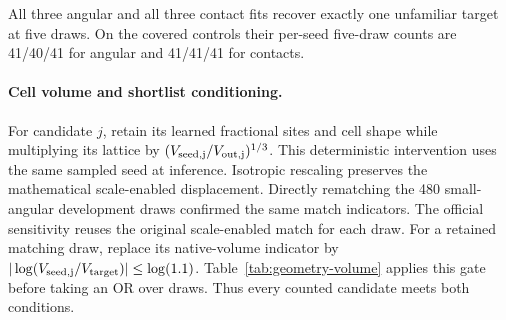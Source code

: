 All three angular and all three contact fits recover exactly one unfamiliar target at five draws. On the covered controls their per-seed five-draw counts are 41/40/41 for angular and 41/41/41 for contacts.

\paragraph{Cell volume and shortlist conditioning.}

For candidate $j$, retain its learned fractional sites and cell shape while multiplying its lattice by $(V_{\rm seed,j}/V_{\rm out,j})^{1/3}$. This deterministic intervention uses the same sampled seed at inference. Isotropic rescaling preserves the mathematical scale-enabled displacement. Directly rematching the 480 small-angular development draws confirmed the same match indicators. The official sensitivity reuses the original scale-enabled match for each draw. For a retained matching draw, replace its native-volume indicator by $|\log(V_{\rm seed,j}/V_{\rm target})|\leq\log(1.1)$. Table~\ref{tab:geometry-volume} applies this gate before taking an OR over draws. Thus every counted candidate meets both conditions.

